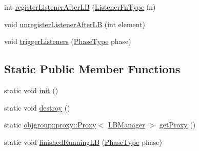\begin{DoxyCompactItemize}
\item 
int \hyperlink{structvt_1_1vrt_1_1collection_1_1balance_1_1_l_b_manager_aa1766ec44d792acb5bae25162ce4c1de}{register\+Listener\+After\+LB} (\hyperlink{structvt_1_1vrt_1_1collection_1_1balance_1_1_l_b_manager_a1bb65b50c7cefb8c139a9f40a83ca18b}{Listener\+Fn\+Type} fn)
\item 
void \hyperlink{structvt_1_1vrt_1_1collection_1_1balance_1_1_l_b_manager_a3b60d748591ddfa5992eadbe7773fe47}{unregister\+Listener\+After\+LB} (int element)
\item 
void \hyperlink{structvt_1_1vrt_1_1collection_1_1balance_1_1_l_b_manager_a9baae1400676077dbe9b8f1805fab395}{trigger\+Listeners} (\hyperlink{namespacevt_a46ce6733d5cdbd735d561b7b4029f6d7}{Phase\+Type} phase)
\end{DoxyCompactItemize}
\subsection*{Static Public Member Functions}
\begin{DoxyCompactItemize}
\item 
static void \hyperlink{structvt_1_1vrt_1_1collection_1_1balance_1_1_l_b_manager_aaee7e85b5572e84723eb6198326b76a8}{init} ()
\item 
static void \hyperlink{structvt_1_1vrt_1_1collection_1_1balance_1_1_l_b_manager_a2cb851831494ddc59c0e4f12d845a884}{destroy} ()
\item 
static \hyperlink{structvt_1_1objgroup_1_1proxy_1_1_proxy}{objgroup\+::proxy\+::\+Proxy}$<$ \hyperlink{structvt_1_1vrt_1_1collection_1_1balance_1_1_l_b_manager}{L\+B\+Manager} $>$ \hyperlink{structvt_1_1vrt_1_1collection_1_1balance_1_1_l_b_manager_a53b7b5a5ccd63e0af55f88c5abb4534c}{get\+Proxy} ()
\item 
static void \hyperlink{structvt_1_1vrt_1_1collection_1_1balance_1_1_l_b_manager_af78c27f2e951e965e287273461ad1d3e}{finished\+Running\+LB} (\hyperlink{namespacevt_a46ce6733d5cdbd735d561b7b4029f6d7}{Phase\+Type} phase)
\end{DoxyCompactItemize}
